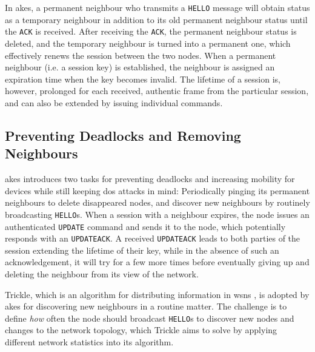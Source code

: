 In \gls{akes}, a permanent neighbour who transmits a \texttt{HELLO} message will obtain status as a temporary neighbour in addition to its old permanent neighbour status until the \texttt{ACK} is received. After receiving the \texttt{ACK}, the permanent neighbour status is deleted, and the temporary neighbour is turned into a permanent one, which effectively renews the session between the two nodes. When a permanent neighbour (i.e. a session key) is established, the neighbour is assigned an expiration time when the key becomes invalid. The lifetime of a session is, however, prolonged for each received, authentic frame from the particular session, and can also be extended by issuing individual commands. 

\subsection{Preventing Deadlocks and Removing Neighbours}

\gls{akes} introduces two tasks for preventing deadlocks and increasing mobility for devices while still keeping \gls{dos} attacks in mind: Periodically pinging its permanent neighbours to delete disappeared nodes, and discover new neighbours by routinely broadcasting \texttt{HELLO}s. When a session with a neighbour expires, the node issues an authenticated \texttt{UPDATE} command and sends it to the node, which potentially responds with an \texttt{UPDATEACK}. A received \texttt{UPDATEACK} leads to both parties of the session extending the lifetime of their key, while in the absence of such an acknowledgement, it will try for a few more times before eventually giving up and deleting the neighbour from its view of the network.

Trickle, which is an algorithm for distributing information in \gls{wsn}s \cite{levis2011trickle}, is adopted by \gls{akes} for discovering new neighbours in a routine matter. The challenge is to define \emph{how} often the node should broadcast \texttt{HELLO}s to discover new nodes and changes to the network topology, which Trickle aims to solve by applying different network statistics into its algorithm.


